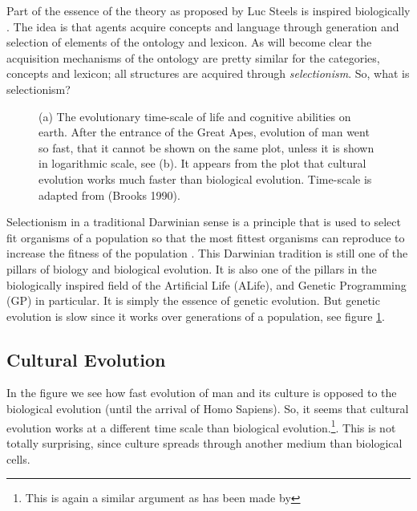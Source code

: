 Part of the essence of the theory as proposed by Luc Steels is inspired biologically \cite{steels:1994a,steels:1996a}. The idea is that agents acquire concepts and language through generation and selection of elements of the ontology and lexicon. As will become clear the acquisition mechanisms of the ontology are pretty similar for the categories, concepts and lexicon; all structures are acquired through {\em selectionism}. So, what is selectionism?

\begin{figure}
\centerline{}
\caption{(a) The evolutionary time-scale of life and cognitive abilities on earth. After the entrance of the Great Apes, evolution of man went so fast, that it cannot be shown on the same plot, unless it is shown in logarithmic scale, see (b). It appears from the plot that cultural evolution works much faster than biological evolution. Time-scale is adapted from (Brooks 1990).}
\label{f:theory:evolution}
\end{figure}

Selectionism in a traditional Darwinian sense is a principle that is used to select fit organisms of a population so that the most fittest organisms can reproduce to increase the fitness of the population \cite{darwin:1968}. This Darwinian tradition is still one of the pillars of biology and biological evolution. It is also one of the pillars in the biologically inspired field of the Artificial Life (ALife), and Genetic Programming (GP) in particular. It is simply the essence of genetic evolution. But genetic evolution is slow since it works over generations of a population, see figure \ref{f:theory:evolution}. 

\subsection{Cultural Evolution}

In the figure we see how fast evolution of man and its culture is opposed to the biological evolution (until the arrival of Homo Sapiens). So, it seems that cultural evolution works at a different time scale than biological evolution.\footnote{This is again a similar argument as has been made by }. This is not totally surprising, since culture spreads through another medium than biological cells. 

